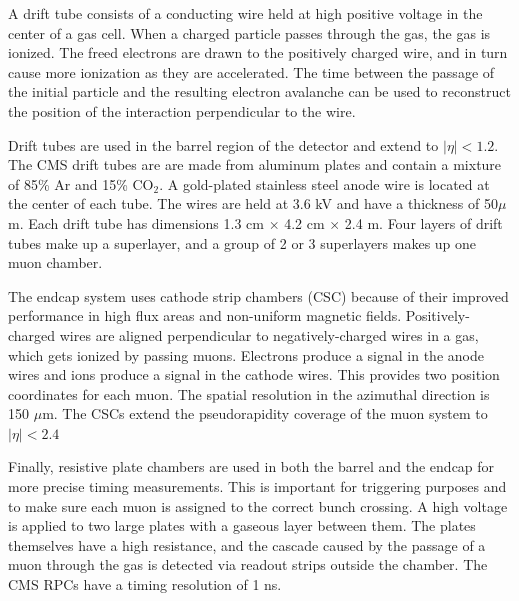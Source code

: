 A drift tube consists of a conducting wire held at high positive voltage in the center of a gas cell. When a charged particle passes through the gas, the gas is ionized. The freed electrons are drawn to the positively charged wire, and in turn cause more ionization as they are accelerated. The time between the passage of the initial particle and the resulting electron avalanche can be used to reconstruct the position of the interaction perpendicular to the wire.

Drift tubes are used in the barrel region of the detector and extend to $|\eta| < 1.2$. The CMS drift tubes are are made from aluminum plates and contain a mixture of 85\% Ar and 15\% CO$_2$. A gold-plated stainless steel anode wire is located at the center of each tube. The wires are held at 3.6 kV and have a thickness of 50$\mu$m. Each drift tube has dimensions 1.3 cm $\times$ 4.2 cm $\times$ 2.4 m. Four layers of drift tubes make up a superlayer, and a group of 2 or 3 superlayers makes up one muon chamber.

The endcap system uses cathode strip chambers (CSC) because of their improved performance in high flux areas and non-uniform magnetic fields. Positively-charged wires are aligned perpendicular to negatively-charged wires in a gas, which gets ionized by passing muons. Electrons produce a signal in the anode wires and ions produce a signal in the cathode wires. This provides two position coordinates for each muon. The spatial resolution in the azimuthal direction is 150 $\mu$m. The CSCs extend the pseudorapidity coverage of the muon system to $|\eta| < 2.4$

Finally, resistive plate chambers are used in both the barrel and the endcap for more precise timing measurements. This is important for triggering purposes and to make sure each muon is assigned to the correct bunch crossing. A high voltage is applied to two large plates with a gaseous layer between them. The plates themselves have a high resistance, and the cascade caused by the passage of a muon through the gas is detected via readout strips outside the chamber. The CMS RPCs have a timing resolution of 1 ns. 


